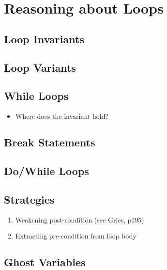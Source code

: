 \section{Reasoning about Loops}

\subsection{Loop Invariants}
\subsection{Loop Variants}
\subsection{While Loops}
\begin{itemize}
\item Where does the invariant hold?
\end{itemize}
\subsection{Break Statements}
\subsection{Do/While Loops}
\subsection{Strategies}
\begin{enumerate}
\item Weakening post-condition (see Gries, p195)
\item Extracting pre-condition from loop body
\end{enumerate}
\subsection{Ghost Variables}